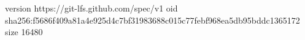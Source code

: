 version https://git-lfs.github.com/spec/v1
oid sha256:f5686f409a81a4e925d4c7bf31983688c015c77febf968ea5db95bddc1365172
size 16480
